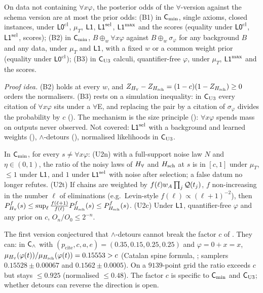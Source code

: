 \begin{theorem}\label{thm:univ:B}
On data not containing $\forall x\varphi$, the posterior odds of the $\forall$-version against the schema version are at most the prior odds: \textup{(B1)} in $\mathsf{C}_{\min}$, single axioms, closed instances, under $\mathord{\mathsf{L0}}^{\mathrm{cl}}$, $\mu_T$, $\mathord{\mathsf{L1}}$, $\mathord{\mathsf{L1}}^{\mathrm{sel}}$, $\mathord{\mathsf{L1}}^{\max}$ and the scores (equality under $\mathord{\mathsf{L0}}^{\mathrm{cl}}$, $\mathord{\mathsf{L1}}^{\mathrm{sel}}$, scores); \textup{(B2)} in $\mathsf{C}_{\min}$, $B\oplus_w\forall x\varphi$ against $B\oplus_w\sigma_\varphi$ for any background $B$ and any data, under $\mu_T$ and $\mathord{\mathsf{L1}}$, with a fixed $w$ or a common weight prior (equality under $\mathord{\mathsf{L0}}^{\mathrm{cl}}$); \textup{(B3)} in $\mathsf{C}_{\mathrm{U3}}$ calculi, quantifier-free $\varphi$, under $\mu_T$, $\mathord{\mathsf{L1}}^{\max}$ and the scores.
\end{theorem}

\noindent\emph{Proof idea.} (B2) holds at every $w$, and $Z_{H_{\forall}}-Z_{H_{\mathrm{sch}}}=(1-c)(1-Z_{H_{\mathrm{sch}}})\ge0$ orders the normalisers. (B3) rests on a simulation inequality: in $\mathsf{C}_{\mathrm{U3}}$ every citation of $\forall x\varphi$ sits under a $\forall$E, and replacing the pair by a citation of $\sigma_\varphi$ divides the probability by $c$ (). The mechanism is the size principle (): $\forall x\varphi$ spends mass on outputs never observed. Not covered: $\mathord{\mathsf{L1}}^{\mathrm{sel}}$ with a background and learned weights (), $\wedge$-detours (), normalised likelihoods in $\mathsf{C}_{\mathrm{U3}}$.

\begin{proposition}\label{prop:univ:robust}
In $\mathsf{C}_{\min}$, for every $s\neq\forall x\varphi$: \textup{(U2n)} with a full-support noise law $N$ and $\eta\in(0,1)$, the ratio of the noisy laws of $H_{\forall}$ and $H_{\mathrm{sch}}$ at $s$ is in $[c,1]$ under $\mu_T$, $\le1$ under $\mathord{\mathsf{L1}}$, and $1$ under $\mathord{\mathsf{L1}}^{\mathrm{sel}}$ with noise after selection; a false datum no longer refutes. \textup{(U2t)} If chains are weighted by $f(\ell)w_A\prod_j\mathcal{Q}(t_j)$, $f$ non-increasing in the number $\ell$ of eliminations (e.g.\ Levin-style $f(\ell)\propto(\ell+1)^{-2}$), then $P^f_{H_{\forall}}(s)\le\sup_\ell\frac{f(\ell+1)}{f(\ell)}P^f_{H_{\mathrm{sch}}}(s)\le P^f_{H_{\mathrm{sch}}}(s)$. \textup{(U2c)} Under $\mathord{\mathsf{L1}}$, quantifier-free $\varphi$ and any prior on $c$, $O_n/O_0\le2^{-n}$.
\end{proposition}

\begin{remark}\label{rem:univ:detour}
The first version conjectured that $\wedge$-detours cannot break the factor $c$ of . They can: in $\mathsf{C}_{\wedge}$ with $(p_{\mathrm{cite}},c,a,e)=(0.35,0.15,0.25,0.25)$ and $\varphi=0+x=x$, $\mu_{H_{\forall}}(\varphi(t))/\mu_{H_{\mathrm{sch}}}(\varphi(t))=0.15553>c$ (Catalan spine formula, ; samplers $0.15528\pm0.00067$ and $0.1562\pm0.0005$). On a $9139$-point grid the ratio exceeds $c$ but stays $\le0.925$ (normalised $\le0.48$). The factor $c$ is specific to $\mathsf{C}_{\min}$ and $\mathsf{C}_{\mathrm{U3}}$; whether detours can reverse the direction is open.
\end{remark}

